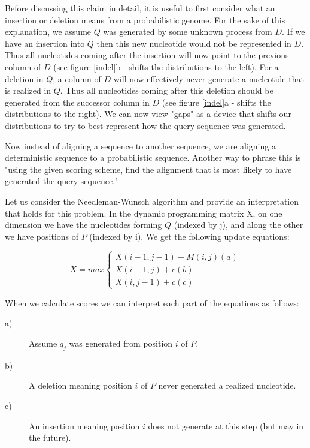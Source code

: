 \documentclass[11pt]{IEEEtran}
\begin{document}
Before discussing this claim in detail, it is useful to first consider what an insertion or deletion means from a probabilistic genome. For the sake of this explanation, we assume $Q$ was generated by some unknown process from $D$. If we have an insertion into $Q$ then this new nucleotide would not be represented in $D$. Thus all nucleotides coming after the insertion will now point to the previous column of $D$ (see figure \ref{indel}b - shifts the distributions to the left). For a deletion in $Q$, a column of $D$ will now effectively never generate a nucleotide that is realized in $Q$. Thus all nucleotides coming after this deletion should be generated from the successor column in $D$ (see figure \ref{indel}a - shifts the distributions to the right). We can now view "gaps" as a device that shifts our distributions to try to best represent how the query sequence was generated.

Now instead of aligning a sequence to another sequence, we are aligning a deterministic sequence to a probabilistic sequence. Another way to phrase this is "using the given scoring scheme, find the alignment that is most likely to have generated the query sequence." 

Let us consider the Needleman-Wunsch algorithm and provide an interpretation that holds for this problem. In the dynamic programming matrix X, on one dimension we have the nucleotides forming $Q$ (indexed by j), and along the other we have positions of $P$ (indexed by i). We get the following update equations:

\begin{equation}
X = max
\begin{cases}
X(i-1,j-1) + M(i,j) (a)\\
X(i-1, j) + c (b)\\
X(i, j-1) + c (c)
\end{cases}
\end{equation}

When we calculate scores we can interpret each part of the equations as follows:

\begin{description}
  \item[a)] Assume $q_j$ was generated from position $i$ of $P$.
  \item[b)] A deletion meaning position $i$ of $P$ never generated a realized nucleotide.
  \item[c)] An insertion meaning position $i$ does not generate at this step (but may in the future).
\end{description}
\end{document}
